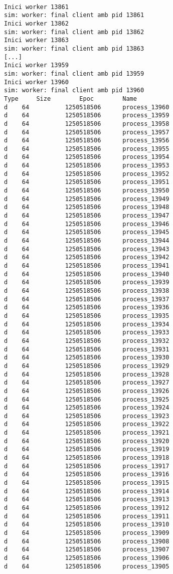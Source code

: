 \begin{footnotesize}
\begin{verbatim}

Inici worker 13861
sim: worker: final client amb pid 13861
Inici worker 13862
sim: worker: final client amb pid 13862
Inici worker 13863
sim: worker: final client amb pid 13863
[...]
Inici worker 13959
sim: worker: final client amb pid 13959
Inici worker 13960
sim: worker: final client amb pid 13960
Type 	 Size 		 Epoc 		 Name 
d 	 64 		 1250518506 	 process_13960 
d 	 64 		 1250518506 	 process_13959 
d 	 64 		 1250518506 	 process_13958 
d 	 64 		 1250518506 	 process_13957 
d 	 64 		 1250518506 	 process_13956 
d 	 64 		 1250518506 	 process_13955 
d 	 64 		 1250518506 	 process_13954 
d 	 64 		 1250518506 	 process_13953 
d 	 64 		 1250518506 	 process_13952 
d 	 64 		 1250518506 	 process_13951 
d 	 64 		 1250518506 	 process_13950 
d 	 64 		 1250518506 	 process_13949 
d 	 64 		 1250518506 	 process_13948 
d 	 64 		 1250518506 	 process_13947 
d 	 64 		 1250518506 	 process_13946 
d 	 64 		 1250518506 	 process_13945 
d 	 64 		 1250518506 	 process_13944 
d 	 64 		 1250518506 	 process_13943 
d 	 64 		 1250518506 	 process_13942 
d 	 64 		 1250518506 	 process_13941 
d 	 64 		 1250518506 	 process_13940 
d 	 64 		 1250518506 	 process_13939 
d 	 64 		 1250518506 	 process_13938 
d 	 64 		 1250518506 	 process_13937 
d 	 64 		 1250518506 	 process_13936 
d 	 64 		 1250518506 	 process_13935 
d 	 64 		 1250518506 	 process_13934 
d 	 64 		 1250518506 	 process_13933 
d 	 64 		 1250518506 	 process_13932 
d 	 64 		 1250518506 	 process_13931 
d 	 64 		 1250518506 	 process_13930 
d 	 64 		 1250518506 	 process_13929 
d 	 64 		 1250518506 	 process_13928 
d 	 64 		 1250518506 	 process_13927 
d 	 64 		 1250518506 	 process_13926 
d 	 64 		 1250518506 	 process_13925 
d 	 64 		 1250518506 	 process_13924 
d 	 64 		 1250518506 	 process_13923 
d 	 64 		 1250518506 	 process_13922 
d 	 64 		 1250518506 	 process_13921 
d 	 64 		 1250518506 	 process_13920 
d 	 64 		 1250518506 	 process_13919 
d 	 64 		 1250518506 	 process_13918 
d 	 64 		 1250518506 	 process_13917 
d 	 64 		 1250518506 	 process_13916 
d 	 64 		 1250518506 	 process_13915 
d 	 64 		 1250518506 	 process_13914 
d 	 64 		 1250518506 	 process_13913 
d 	 64 		 1250518506 	 process_13912 
d 	 64 		 1250518506 	 process_13911 
d 	 64 		 1250518506 	 process_13910 
d 	 64 		 1250518506 	 process_13909 
d 	 64 		 1250518506 	 process_13908 
d 	 64 		 1250518506 	 process_13907 
d 	 64 		 1250518506 	 process_13906 
d 	 64 		 1250518506 	 process_13905 

\end{verbatim}
\end{footnotesize}
